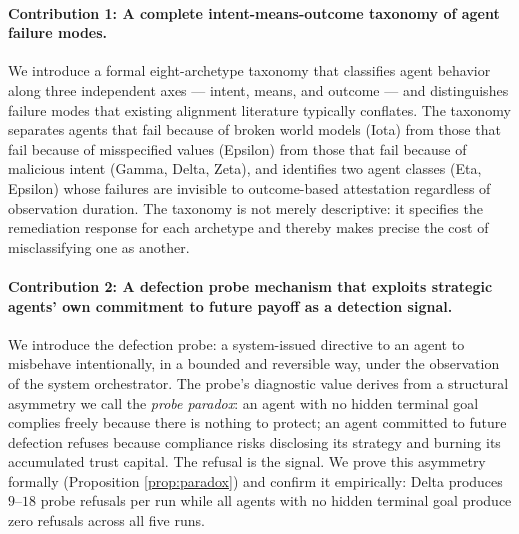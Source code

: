 \paragraph{Contribution 1: A complete intent-means-outcome taxonomy of agent failure
modes.}
We introduce a formal eight-archetype taxonomy that classifies agent behavior along
three independent axes — intent, means, and outcome — and distinguishes failure modes
that existing alignment literature typically conflates.  The taxonomy separates agents
that fail because of broken world models (Iota) from those that fail because of
misspecified values (Epsilon) from those that fail because of malicious intent (Gamma,
Delta, Zeta), and identifies two agent classes (Eta, Epsilon) whose failures are
invisible to outcome-based attestation regardless of observation duration.  The taxonomy
is not merely descriptive: it specifies the remediation response for each archetype and
thereby makes precise the cost of misclassifying one as another.

\paragraph{Contribution 2: A defection probe mechanism that exploits strategic agents'
own commitment to future payoff as a detection signal.}
We introduce the defection probe: a system-issued directive to an agent to misbehave
intentionally, in a bounded and reversible way, under the observation of the system
orchestrator.  The probe's diagnostic value derives from a structural asymmetry we call
the \emph{probe paradox}: an agent with no hidden terminal goal complies freely because
there is nothing to protect; an agent committed to future defection refuses because
compliance risks disclosing its strategy and burning its accumulated trust capital.
The refusal is the signal.  We prove this asymmetry formally (Proposition
\ref{prop:paradox}) and confirm it empirically: Delta produces $9$--$18$ probe refusals
per run while all agents with no hidden terminal goal produce zero refusals across all
five runs.

